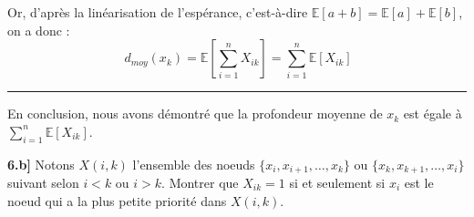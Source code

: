 \documentclass[a4paper,12pt]{report}
\begin{document}
\begin{tcolorbox}[colback=gray!10, colframe=blue!30, coltitle=black, title=Réponse à la 6.a - 2/2]

    Or, d'après la linéarisation de l'espérance, c'est-à-dire \( \mathbb{E}[a+b] = \mathbb{E}[a] + \mathbb{E}[b] \), on a donc :
    \[
    \ d_{moy}(x_k) = \mathbb{E}[\sum_{i = 1}^{n} X_{ik}] = \sum_{i = 1}^{n} \mathbb{E}[X_{ik}]
    \]

    \vspace{0.5cm}
    \hrule
    \vspace{0.5cm}

    En conclusion, nous avons démontré que la profondeur moyenne de \( x_k \) est égale à \(\sum_{i = 1}^{n} \mathbb{E}[X_{ik}]\).

\end{tcolorbox}  




\newpage
{}

\textbf{6.b]} Notons \( X(i,k) \) l'ensemble des noeuds \( \{x_i, x_{i+1}, \dots, x_k \} \) ou \( \{x_k, x_{k+1}, \dots, x_i \} \) suivant selon \(i < k\) 
    ou \( i > k \). Montrer que \( X_{ik} = 1 \) si et seulement si \( x_i \) est le noeud qui a la plus petite priorité dans \( X(i,k) \).
\end{document}
